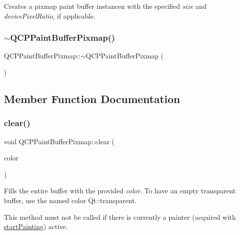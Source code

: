 Creates a pixmap paint buffer instancen with the specified {\itshape size} and {\itshape device\+Pixel\+Ratio}, if applicable. \mbox{\label{class_q_c_p_paint_buffer_pixmap_a52b00bff4a36085b197bd374d5d24450}} 
\subsubsection{\texorpdfstring{$\sim$\+Q\+C\+P\+Paint\+Buffer\+Pixmap()}{~QCPPaintBufferPixmap()}}
{\footnotesize\ttfamily Q\+C\+P\+Paint\+Buffer\+Pixmap\+::$\sim$\+Q\+C\+P\+Paint\+Buffer\+Pixmap (\begin{DoxyParamCaption}{ }\end{DoxyParamCaption})\hspace{0.3cm}{\ttfamily [virtual]}}



\subsection{Member Function Documentation}
\mbox{\label{class_q_c_p_paint_buffer_pixmap_a14badbd010a3cde6b55817ccb7b65217}} 
\subsubsection{\texorpdfstring{clear()}{clear()}}
{\footnotesize\ttfamily void Q\+C\+P\+Paint\+Buffer\+Pixmap\+::clear (\begin{DoxyParamCaption}\item[{const Q\+Color \&}]{color }\end{DoxyParamCaption})\hspace{0.3cm}{\ttfamily [virtual]}}

Fills the entire buffer with the provided {\itshape color}. To have an empty transparent buffer, use the named color {\ttfamily Qt\+::transparent}.

This method must not be called if there is currently a painter (acquired with \hyperlink{class_q_c_p_paint_buffer_pixmap_a357964ef7d28cfa530338be4e5c93234}{start\+Painting}) active. 

